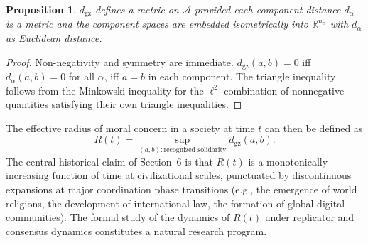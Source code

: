 \documentclass[12pt]{article}
\newtheorem{proposition}[theorem]{Proposition}
\begin{document}
\begin{proposition}
$d_{\mathrm{gz}}$ defines a metric on $\mathcal{A}$ provided each component distance $d_\alpha$ is a metric and the component spaces are embedded isometrically into $\mathbb{R}^{n_\alpha}$ with $d_\alpha$ as Euclidean distance.
\end{proposition}

\begin{proof}
Non-negativity and symmetry are immediate. $d_{\mathrm{gz}}(a,b) = 0$ iff $d_\alpha(a,b) = 0$ for all $\alpha$, iff $a = b$ in each component. The triangle inequality follows from the Minkowski inequality for the $\ell^2$ combination of nonnegative quantities satisfying their own triangle inequalities.
\end{proof}

The effective radius of moral concern in a society at time $t$ can then be defined as
\[
R(t) = \sup_{(a,b): \text{recognized solidarity}} d_{\mathrm{gz}}(a,b).
\]
The central historical claim of Section~6 is that $R(t)$ is a monotonically increasing function of time at civilizational scales, punctuated by discontinuous expansions at major coordination phase transitions (e.g., the emergence of world religions, the development of international law, the formation of global digital communities). The formal study of the dynamics of $R(t)$ under replicator and consensus dynamics constitutes a natural research program.
\end{document}

